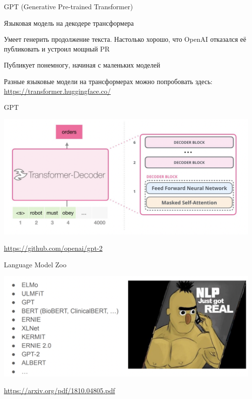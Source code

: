 \documentclass[notes,12pt, aspectratio=169]{beamer}
\newenvironment{wideitemize}{\itemize\addtolength{\itemsep}{10pt}}{\enditemize}
\begin{document}
\begin{frame}{GPT (Generative Pre-trained Transformer)}
	\begin{wideitemize}
		\item  Языковая модель на декодере трансформера
		\item  Умеет генерить продолжение текста. Настолько хорошо, что OpenAI
		отказался её публиковать и устроил мощный PR
		\item  Публикует понемногу, начиная с маленьких моделей
		\item  Разные языковые модели на трансформерах можно попробовать здесь: \url{
		https://transformer.huggingface.co/}
	\end{wideitemize}
\end{frame}


\begin{frame}{GPT}
	\begin{center}
	\includegraphics[width=0.9\linewidth]{masked_att_gpt.png}
\end{center}
	\vfill
	\footnotesize
	{\color{blue} \url{https://github.com/openai/gpt-2}}
\end{frame}



\begin{frame}{Language Model Zoo}
	\begin{center}
		\includegraphics[width=.99\linewidth]{lang_zoo.png}
	\end{center}
	\vfill
	\footnotesize
	{\color{blue} \url{https://arxiv.org/pdf/1810.04805.pdf}}
\end{frame}
\end{document}
